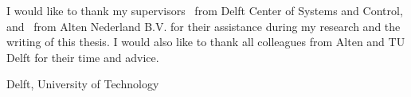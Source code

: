 \documentclass[a4paper,11pt]{mscThesis}
\begin{document}
%
\frontmatter %
%
 \maketitle
%

%
    I would like to thank my supervisors \mscreaderone\ from Delft Center of Systems and Control, and \mscreaderfour\ from Alten Nederland B.V. for their assistance during my research and the writing of this thesis. I would also like to thank all colleagues from Alten and TU Delft for their time and advice.
    \vspace*{15mm}

    \noindent
    Delft, University of Technology \hfill \mscname\\
    \mscdate

%
    \tocloflot
%
    
    \cleardoublepage%
%
%
\mainmatter
%
%
%





%



%

%


	
\appendix



\backmatter
	
%	
	
	
	
	\printindex

	\printnomenclature[2 cm]




\end{document}
